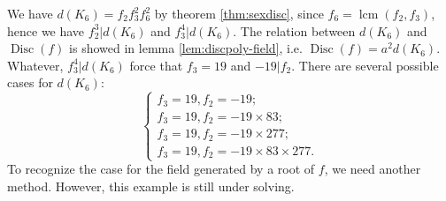 We have $d(K_6)=f_2f_3^2f_6^2$ by theorem \ref{thm:sexdisc}, since $f_6=\operatorname{lcm}(f_2,f_3)$, hence we have $f_2^3|d(K_6)$ and $f_3^4|d(K_6)$. The relation between $d(K_6)$ and $\operatorname{Disc}(f)$ is showed in lemma \ref{lem:discpoly-field}, i.e. $\operatorname{Disc}(f)=a^2d(K_6)$. Whatever, $f_3^4|d(K_6)$ force that $f_3=19$ and $-19|f_2$. There are several possible cases for $d(K_6)$:
\begin{equation*}
\left\{ \begin{array}{l}
f_3=19,f_2=-19;\\
f_3=19,f_2=-19\times 83;\\
f_3=19,f_2=-19\times 277;\\
f_3=19,f_2=-19\times 83\times 277.
\end{array} \right.
\end{equation*}
To recognize the case for the field generated by a root of $f$, we need another method. However, this example is still under solving.

